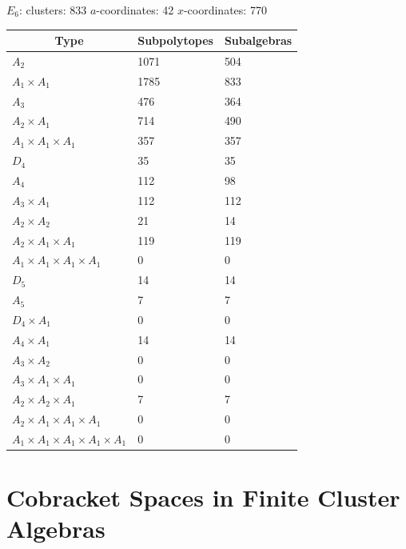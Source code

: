 \documentclass[11pt]{article}
\begin{document}
{\Large\underline{\(E_6\)}:} \quad clusters: 833 \qquad \(a\)-coordinates: 42 \qquad \(x\)-coordinates: 770\\

\begin{tabular}{ | l | l | l |}
\multicolumn{1}{c}{Type} &  \multicolumn{1}{c}{Subpolytopes}  &  \multicolumn{1}{c}{Subalgebras} \\
\hline \(A_2\) & 1071 & 504 \\ 
\hline \(A_1 \times A_1\) & 1785 & 833 \\ \hline 
\hline \(A_3\) & 476 & 364 \\ 
\hline \(A_2 \times A_1\) & 714 & 490 \\ 
\hline \(A_1 \times A_1 \times A_1\) & 357 & 357 \\ \hline 
\hline \(D_4\) & 35 & 35 \\ 
\hline \(A_4\) & 112 & 98 \\ 
\hline \(A_3 \times A_1\) & 112 & 112 \\ 
\hline \(A_2 \times A_2\) & 21 & 14 \\ 
\hline \(A_2 \times A_1 \times A_1\) & 119 & 119 \\ 
\hline \(A_1 \times A_1 \times A_1 \times A_1\) & 0 & 0 \\ \hline 
\hline \(D_5\) & 14 & 14 \\ 
\hline \(A_5\) & 7 & 7 \\ 
\hline \(D_4 \times A_1\) & 0 & 0 \\ 
\hline \(A_4 \times A_1\) & 14 & 14 \\ 
\hline \(A_3 \times A_2\) & 0 & 0 \\ 
\hline \(A_3 \times A_1 \times A_1\) & 0 & 0 \\ 
\hline \(A_2 \times A_2 \times A_1\) & 7 & 7 \\ 
\hline \(A_2 \times A_1 \times A_1 \times A_1\) & 0 & 0 \\ 
\hline \(A_1 \times A_1 \times A_1 \times A_1 \times A_1\) & 0 & 0 \\ 
\hline
\end{tabular}

\section{Cobracket Spaces in Finite Cluster Algebras}\label{appendix:cobrackets}




\end{document}
